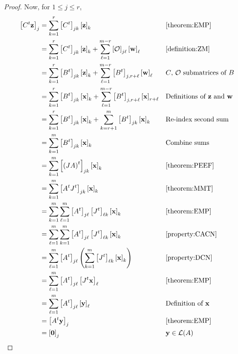\documentclass{ximera}
\begin{document}
\begin{theorem}
\begin{proof}
  Now, for $1\leq j\leq r$,
  \begin{align*}
    \left\lbrack C^{t}\mathbf{z}\right\rbrack_{j}
    &=\sum_{k=1}^{r}\left\lbrack C^{t}\right\rbrack_{jk}\left\lbrack\mathbf{z}\right\rbrack_{k}
    &&\ref{theorem:EMP}\\
    &=\sum_{k=1}^{r}\left\lbrack C^{t}\right\rbrack_{jk}\left\lbrack\mathbf{z}\right\rbrack_{k}+
      \sum_{\ell=1}^{m-r}\left\lbrack\mathcal{O}\right\rbrack_{j\ell}\left\lbrack\mathbf{w}\right\rbrack_{\ell}
    &&\ref{definition:ZM}\\
    &=\sum_{k=1}^{r}\left\lbrack B^{t}\right\rbrack_{jk}\left\lbrack\mathbf{z}\right\rbrack_{k}+
      \sum_{\ell=1}^{m-r}\left\lbrack B^{t}\right\rbrack_{j,r+\ell}\left\lbrack\mathbf{w}\right\rbrack_{\ell}
    &&\text{$C$, $\mathcal{O}$ submatrices of $B$}\\
    &=\sum_{k=1}^{r}\left\lbrack B^{t}\right\rbrack_{jk}\left\lbrack\mathbf{x}\right\rbrack_{k}+
      \sum_{\ell=1}^{m-r}\left\lbrack B^{t}\right\rbrack_{j,r+\ell}\left\lbrack\mathbf{x}\right\rbrack_{r+\ell}
    &&\text{Definitions of $\mathbf{z}$ and $\mathbf{w}$}\\
    &=\sum_{k=1}^{r}\left\lbrack B^{t}\right\rbrack_{jk}\left\lbrack\mathbf{x}\right\rbrack_{k}+
      \sum_{k=r+1}^{m}\left\lbrack B^{t}\right\rbrack_{jk}\left\lbrack\mathbf{x}\right\rbrack_{k}
    &&\text{Re-index second sum}\\
    &=\sum_{k=1}^{m}\left\lbrack B^{t}\right\rbrack_{jk}\left\lbrack\mathbf{x}\right\rbrack_{k}
    &&\text{Combine sums}\\
    &=\sum_{k=1}^{m}\left\lbrack\left(JA\right)^{t}\right\rbrack_{jk}\left\lbrack\mathbf{x}\right\rbrack_{k}
    &&\ref{theorem:PEEF}\\
    &=\sum_{k=1}^{m}\left\lbrack A^{t}J^{t}\right\rbrack_{jk}\left\lbrack\mathbf{x}\right\rbrack_{k}
    &&\ref{theorem:MMT}\\
    &=\sum_{k=1}^{m}\sum_{\ell=1}^{m}\left\lbrack A^{t}\right\rbrack_{j\ell}\left\lbrack J^{t}\right\rbrack_{\ell k}\left\lbrack\mathbf{x}\right\rbrack_{k}
    &&\ref{theorem:EMP}\\
    &=\sum_{\ell=1}^{m}\sum_{k=1}^{m}\left\lbrack A^{t}\right\rbrack_{j\ell}\left\lbrack J^{t}\right\rbrack_{\ell k}\left\lbrack\mathbf{x}\right\rbrack_{k}
    &&\ref{property:CACN}\\
    &=\sum_{\ell=1}^{m}\left\lbrack A^{t}\right\rbrack_{j\ell}\left(\sum_{k=1}^{m}\left\lbrack J^{t}\right\rbrack_{\ell k}\left\lbrack\mathbf{x}\right\rbrack_{k}\right)
    &&\ref{property:DCN}\\
    &=\sum_{\ell=1}^{m}\left\lbrack A^{t}\right\rbrack_{j\ell}\left\lbrack J^{t}\mathbf{x}\right\rbrack_{\ell}
    &&\ref{theorem:EMP}\\
    &=\sum_{\ell=1}^{m}\left\lbrack A^{t}\right\rbrack_{j\ell}\left\lbrack\mathbf{y}\right\rbrack_{\ell}
    &&\text{Definition of $\mathbf{x}$}\\
    &=\left\lbrack A^{t}\mathbf{y}\right\rbrack_{j}
    &&\ref{theorem:EMP}\\
    &=\left\lbrack\mathbf{0}\right\rbrack_{j}
    &&\text{$\mathbf{y}\in\mathcal{L}\!\left(A\right)$}
  \end{align*}
  

\end{proof}
\end{theorem}
\end{document}
